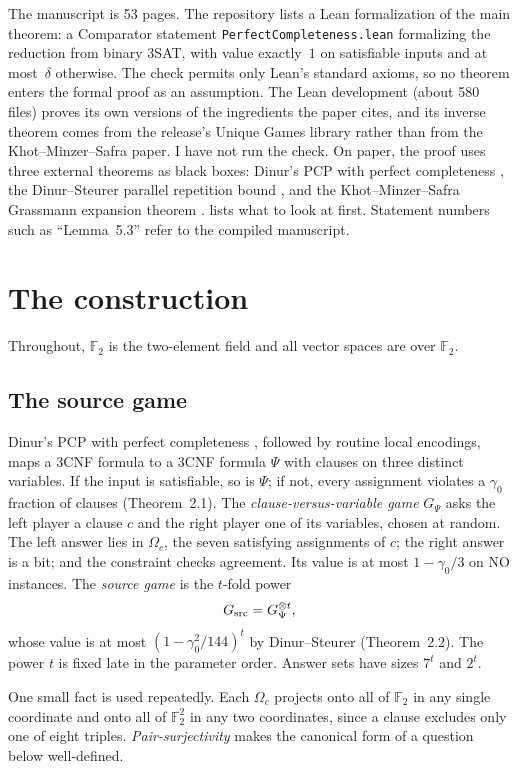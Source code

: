 \documentclass[11pt]{article}
\theoremstyle{definition}
\theoremstyle{remark}
\newcommand{\Fb}{\mathbb F_2}
\begin{document}
The manuscript is 53 pages. The repository lists a Lean formalization of the
main theorem: a Comparator statement \texttt{PerfectCompleteness.lean}
formalizing the reduction from binary 3SAT, with value exactly~$1$ on
satisfiable inputs and at most~$\delta$ otherwise. The check permits only
Lean's standard axioms, so no theorem enters the formal proof as an
assumption. The Lean development (about 580 files) proves its own versions of
the ingredients the paper cites, and its inverse theorem comes from the
release's Unique Games library rather than from the Khot--Minzer--Safra paper.
I have not run the check. On paper, the proof uses three external theorems as
black boxes: Dinur's PCP with perfect completeness \cite{Dinur}, the
Dinur--Steurer parallel repetition bound \cite{DS}, and the
Khot--Minzer--Safra Grassmann expansion theorem \cite{KMS18}.
 lists what to look at first.
Statement numbers such as ``Lemma~5.3'' refer to the compiled manuscript.

\section{The construction}\label{sec:construction}

Throughout, $\Fb$ is the two-element field and all vector spaces are over
$\Fb$.

\subsection{The source game}\label{sec:source}

Dinur's PCP with perfect completeness \cite{Dinur}, followed by routine local
encodings, maps a 3CNF formula to a 3CNF formula $\Psi$ with clauses on three
distinct variables. If the input is satisfiable, so is $\Psi$; if not, every
assignment violates a $\gamma_0$ fraction of clauses (Theorem~2.1). The
\emph{clause-versus-variable game} $G_\Psi$ asks the left player a clause $c$
and the right player one of its variables, chosen at random. The left answer
lies in $\Omega_c$, the seven satisfying assignments of $c$; the right answer
is a bit; and the constraint checks agreement. Its value is at most
$1-\gamma_0/3$ on NO instances. The \emph{source game} is the $t$-fold power
\[
 G_{\rm src}=G_\Psi^{\otimes t},
\]
whose value is at most $(1-\gamma_0^2/144)^t$ by Dinur--Steurer \cite{DS}
(Theorem~2.2). The power $t$ is fixed late in the parameter order. Answer sets
have sizes $7^t$ and $2^t$.

One small fact is used repeatedly. Each $\Omega_c$ projects onto all of
$\Fb$ in any single coordinate and onto all of $\Fb^2$ in any two
coordinates, since a clause excludes only one of eight triples.
\emph{Pair-surjectivity} makes the canonical form of a question below
well-defined.
\end{document}
